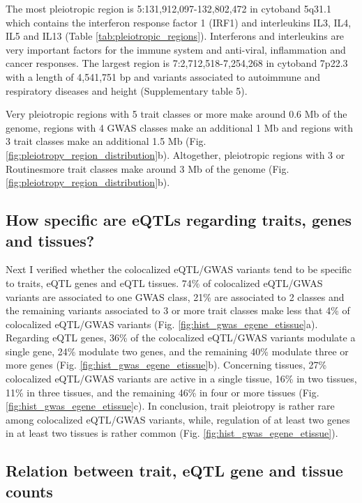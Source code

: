 The most pleiotropic region is 5:131,912,097-132,802,472 in cytoband 5q31.1 which contains the interferon response factor 1
(IRF1) and interleukins IL3, IL4, IL5 and IL13 (Table \ref{tab:pleiotropic_regions}).
%
Interferons and interleukins are very important factors for the immune system and anti-viral, inflammation and cancer responses.
%
The largest region is 7:2,712,518-7,254,268 in cytoband 7p22.3 with a length of 4,541,751 bp and variants associated to
autoimmune and respiratory diseases and height (Supplementary table 5).

Very pleiotropic regions with 5 trait classes or more make around 0.6 Mb of the genome,
regions with 4 GWAS classes make an additional 1 Mb and regions with 3 trait classes make an additional 1.5 Mb (Fig. \ref{fig:pleiotropy_region_distribution}b).
%
Altogether, pleiotropic regions with 3 or Routinesmore trait classes make around 3 Mb of the genome (Fig. \ref{fig:pleiotropy_region_distribution}b).

\subsection*{How specific are eQTLs regarding traits, genes and tissues?}

Next I verified whether the colocalized eQTL/GWAS variants tend to be specific to traits, eQTL genes and eQTL tissues.
%
74\% of colocalized eQTL/GWAS variants are associated to one GWAS class, 21\% are associated to 2 classes and the remaining variants associated to
3 or more trait classes make less that 4\% of colocalized eQTL/GWAS variants (Fig. \ref{fig:hist_gwas_egene_etissue}a).
%
Regarding eQTL genes, 36\% of the colocalized eQTL/GWAS variants modulate a single gene, 24\% modulate two genes, and the
remaining 40\% modulate three or more genes (Fig. \ref{fig:hist_gwas_egene_etissue}b).
%
Concerning tissues, 27\% colocalized eQTL/GWAS variants are active in a single tissue, 16\% in two tissues, 11\% in three
tissues, and the remaining 46\% in four or more tissues (Fig. \ref{fig:hist_gwas_egene_etissue}c).
%
In conclusion, trait pleiotropy is rather rare among colocalized eQTL/GWAS variants, while, regulation of at least two
genes in at least two tissues is rather common (Fig. \ref{fig:hist_gwas_egene_etissue}).

\subsection*{Relation between trait, eQTL gene and tissue counts}

